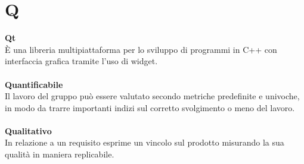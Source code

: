 \section{Q}
\textbf{Qt}\\
È una libreria multipiattaforma per lo sviluppo di programmi in C++ con interfaccia grafica tramite l'uso di widget. \\ \\
\textbf{Quantificabile} \\
Il lavoro del gruppo può essere valutato secondo metriche predefinite e univoche, in modo da trarre importanti indizi sul corretto svolgimento o meno del lavoro. \\ \\
\textbf{Qualitativo}\\
In relazione a un requisito esprime un vincolo sul prodotto misurando la sua qualità in maniera replicabile.  \\ \\
\clearpage 